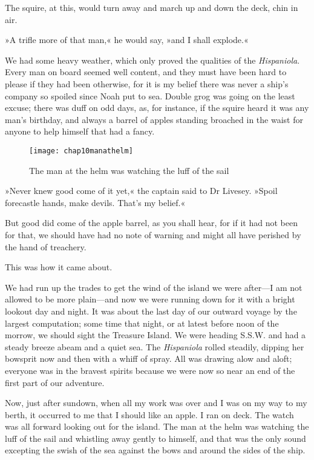 The squire, at this, would turn away and march up and down the deck, chin in air.

»A trifle more of that man,« he would say, »and I shall explode.«

We had some heavy weather, which only proved the qualities of the \textit{Hispaniola}. Every man on board seemed well content, and they must have been hard to please if they had been otherwise, for it is my belief there was never a ship's company so spoiled since Noah put to sea. Double grog was going on the least excuse; there was duff on odd days, as, for instance, if the squire heard it was any man's birthday, and always a barrel of apples standing broached in the waist for anyone to help himself that had a fancy.

 \begin{figure}[ph]
\centering
\texttt{[image: chap10manathelm]}
\caption{The man at the helm was watching the luff of the sail}
\end{figure}

»Never knew good come of it yet,« the captain said to Dr Livesey. »Spoil forecastle hands, make devils. That's my belief.«

But good did come of the apple barrel, as you shall hear, for if it had not been for that, we should have had no note of warning and might all have perished by the hand of treachery.

This was how it came about.

We had run up the trades to get the wind of the island we were after—I am not allowed to be more plain—and now we were running down for it with a bright lookout day and night. It was about the last day of our outward voyage by the largest computation; some time that night, or at latest before noon of the morrow, we should sight the Treasure Island. We were heading S.S.W. and had a steady breeze abeam and a quiet sea. The \textit{Hispaniola} rolled steadily, dipping her bowsprit now and then with a whiff of spray. All was drawing alow and aloft; everyone was in the bravest spirits because we were now so near an end of the first part of our adventure.

Now, just after sundown, when all my work was over and I was on my way to my berth, it occurred to me that I should like an apple. I ran on deck. The watch was all forward looking out for the island. The man at the helm was watching the luff of the sail and whistling away gently to himself, and that was the only sound excepting the swish of the sea against the bows and around the sides of the ship.




